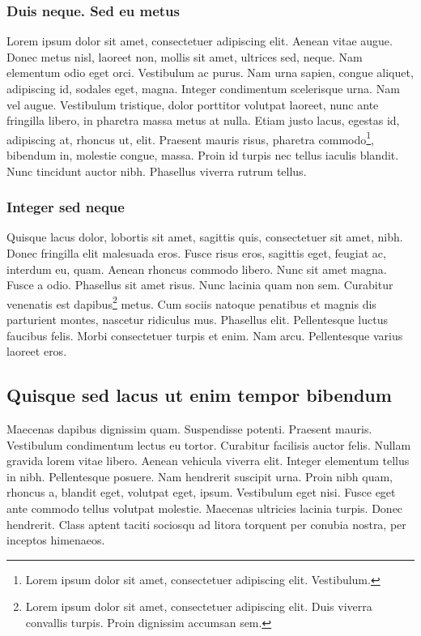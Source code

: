 \subsubsection{Duis neque. Sed eu metus}
Lorem ipsum dolor sit amet, consectetuer adipiscing elit. Aenean vitae augue. Donec metus nisl, laoreet non, mollis sit amet, ultrices sed, neque. Nam elementum odio eget orci. Vestibulum ac purus. Nam urna sapien, congue aliquet, adipiscing id, sodales eget, magna. Integer condimentum scelerisque urna. Nam vel augue. Vestibulum tristique, dolor porttitor volutpat laoreet, nunc ante fringilla libero, in pharetra massa metus at nulla. Etiam justo lacus, egestas id, adipiscing at, rhoncus ut, elit. Praesent mauris risus, pharetra commodo\footnote{Lorem ipsum dolor sit amet, consectetuer adipiscing elit. Vestibulum.}, bibendum in, molestie congue, massa. Proin id turpis nec tellus iaculis blandit. Nunc tincidunt auctor nibh. Phasellus viverra rutrum tellus.

\subsubsection{Integer sed neque}
Quisque lacus dolor, lobortis sit amet, sagittis quis, consectetuer sit amet, nibh. Donec fringilla elit malesuada eros. Fusce risus eros, sagittis eget, feugiat ac, interdum eu, quam. Aenean rhoncus commodo libero. Nunc sit amet magna. Fusce a odio. Phasellus sit amet risus. Nunc lacinia quam non sem. Curabitur venenatis est dapibus\footnote{Lorem ipsum dolor sit amet, consectetuer adipiscing elit. Duis viverra convallis turpis. Proin dignissim accumsan sem.} metus. Cum sociis natoque penatibus et magnis dis parturient montes, nascetur ridiculus mus. Phasellus elit. Pellentesque luctus faucibus felis. Morbi consectetuer turpis et enim. Nam arcu. Pellentesque varius laoreet eros.

\subsection{Quisque sed lacus ut enim tempor bibendum}
Maecenas dapibus dignissim quam. Suspendisse potenti. Praesent mauris. Vestibulum condimentum lectus eu tortor. Curabitur facilisis auctor felis. Nullam gravida lorem vitae libero. Aenean vehicula viverra elit. Integer elementum tellus in nibh. Pellentesque posuere. Nam hendrerit suscipit urna. Proin nibh quam, rhoncus a, blandit eget, volutpat eget, ipsum. Vestibulum eget nisi. Fusce eget ante commodo tellus volutpat molestie. Maecenas ultricies lacinia turpis. Donec hendrerit. Class aptent taciti sociosqu ad litora torquent per conubia nostra, per inceptos himenaeos.

